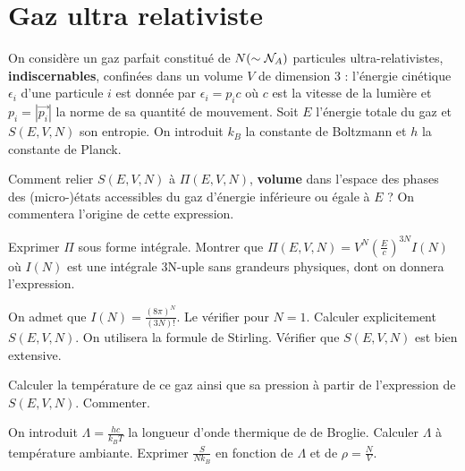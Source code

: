 \documentclass[utf8, 11pt]{feuille}
\begin{document}
\section{Gaz ultra relativiste}

On considère un gaz parfait constitué de $N (\sim {\cal N}_A)$ particules ultra-relativistes, {\bf indiscernables}, confinées dans un volume $V$ de dimension 3 : l'énergie cinétique $\epsilon_i$ d'une particule $i$ est donnée par $\epsilon_i= p_ic$ où $c$ est la vitesse de la lumière et $p_i=|\Vec{p_i}|$ la norme de sa quantité de mouvement. Soit $E$ l'énergie totale du gaz et $S(E,V,N)$ son entropie. On introduit $k_B$ la constante de Boltzmann et $h$ la constante de Planck.

\medskip

\question Comment relier $S(E,V,N)$ à $\Pi(E,V,N)$, {\bf volume} dans l'espace des phases des (micro-)états accessibles du gaz d'énergie inférieure ou égale à $E$ ? On commentera l'origine de cette expression.

\question Exprimer $\Pi$ sous forme intégrale. Montrer que $\Pi(E,V,N)=V^N (\frac{E}{c})^{3N} I(N)$ où $I(N)$ est une intégrale 3N-uple sans grandeurs physiques, dont on donnera l'expression.

\question On admet que $I(N)=\frac{(8 \pi)^N}{(3N)!}$. Le vérifier pour $N=1$. Calculer explicitement $S(E,V,N)$. On utilisera la formule de Stirling. Vérifier que $S(E,V,N)$ est bien extensive.

\question Calculer la température de ce gaz ainsi que sa pression à partir de l'expression de $S(E,V,N)$. Commenter.

\question On introduit $\Lambda=\frac{hc}{k_BT}$ la longueur d'onde thermique de de Broglie. Calculer $\Lambda$ à température ambiante. Exprimer $\frac{S}{N k_B}$ en fonction de $\Lambda$ et de $\rho=\frac{N}{V}$.  
\\
\end{document}
